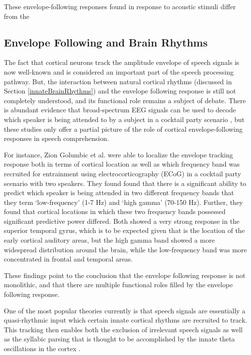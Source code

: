 \documentclass[titlepage]{article}
\begin{document}
    These envelope-following responses found in response to acoustic stimuli differ from the

  \subsection{Envelope Following and Brain Rhythms}

    The fact that cortical neurons track the amplitude envelope of speech signals is now well-known and
    is considered an important part of the speech processing pathway. But, the interaction between
    natural cortical rhythms (discussed in Section \ref{innateBrainRhythms}) and the envelope following
    response is still not completely understood, and its functional role remains a subject of debate.
    There is abundant evidence that broad-spectrum EEG signals can be used to decode which speaker is
    being attended to by a subject in a cocktail party scenario \cite{Horton2014,DeTaillez2018}, but
    these studies only offer a partial picture of the role of cortical envelope-following responses
    in speech comprehension.

    For instance, Zion Golumbic et al. \cite{ZionGolumbic2013} were able to
    localize the envelope tracking response both in terms of cortical location as well as which frequency
    band was recruited for entrainment using electrocorticography (ECoG) in a cocktail party scenario with
    two speakers. They found found that there is a significant ability to predict which speaker is being
    attended in two different frequency bands that they term `low-frequency' (1-7 Hz) and `high gamma' (70-150 Hz).
    Further, they found that cortical locations in which these two frequency bands possessed significant
    predictive power differed. Both showed a very strong response in the superior temporal gyrus,
    which is to be expected given that is the location of the early cortical auditory areas,
    but the high gamma band showed a more widespread distribution around the brain, while the low-frequency band
    was more concentrated in frontal and temporal areas.

    These findings point to the conclusion that the envelope following response is not monolithic, and
    that there are multiple functional roles filled by the envelope following response.

    One of the most popular theories currently is that speech signals
    are essentially a quasi-rhythmic input which certain innate cortical rhythms are recruited to track.
    This tracking then enables both the exclusion of irrelevant speech signals
    \cite{Horton2014,OSullivan2015} as well as the syllabic parsing that is thought to be accomplished
    by the innate theta oscillations in the cortex \cite{Doelling2014,Ghitza2013b}.
\end{document}
